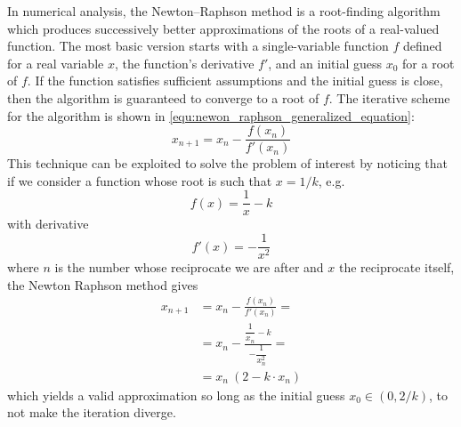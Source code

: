 In numerical analysis, the Newton–Raphson method \cite{Hale2015_a} is a root-finding algorithm which produces successively better approximations of the roots of a real-valued function. The most basic version starts with a single-variable function $f$ defined for a real variable $x$, the function's derivative $f'$, and an initial guess $x_0$ for a root of $f$.
If the function satisfies sufficient assumptions and the initial guess is close, then the algorithm is guaranteed to converge to a root of $f$. The iterative scheme for the algorithm is shown in \eqref{equ:newon_raphson_generalized_equation}:
\begin{equation}\label{equ:newon_raphson_generalized_equation}
x_{n+1} = x_n - \frac{f(x_n)}{f'(x_n)}
\end{equation}
This technique can be exploited to solve the problem of interest by noticing that if we consider a function whose root is such that $x = 1/k$, e.g.
\begin{equation}
f(x) = \frac{1}{x} - k
\end{equation}
with derivative
$$
f'(x) = -\frac{1}{x^2}
$$
where $n$ is the number whose reciprocate we are after and $x$ the reciprocate itself, the Newton Raphson method gives
\begin{equation}
\begin{aligned}
x_{n+1} &= x_n - \frac{f(x_n)}{f'(x_n)} = \\
& = x_n - \frac{\dfrac{1}{x_n} - k}{-\dfrac{1}{x_n^2}} = \\
& = x_n\ (2 - k \cdot x_n)
\end{aligned}
\end{equation}
which yields a valid approximation so long as the initial guess $x_0 \in (0, 2/k)$, to not make the iteration diverge.


